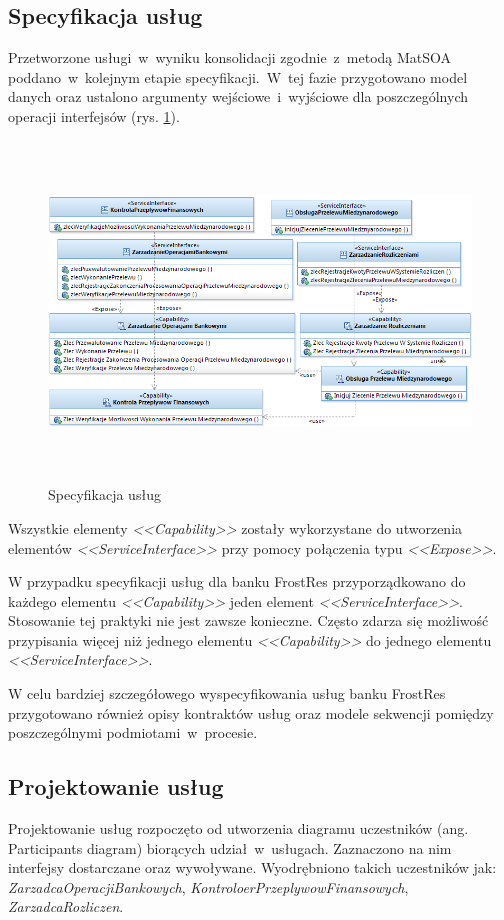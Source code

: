 \subsection{Specyfikacja usług}
Przetworzone usługi~w~wyniku konsolidacji zgodnie~z~metodą MatSOA poddano~w~kolejnym etapie specyfikacji.~W~tej fazie przygotowano model danych oraz ustalono argumenty wejściowe~i~wyjściowe dla poszczególnych operacji interfejsów (rys. \ref{services_specification}).

\begin{figure}[h!tbp]
\begin{centering}
\includegraphics[width=16cm, height=9cm]{img/services_specification_model.png}
\caption[Specyfikacja usług]{Specyfikacja usług}\label{services_specification}
\end{centering}
\end{figure}

Wszystkie elementy \emph{<<Capability>>} zostały wykorzystane do utworzenia elementów \emph{<<ServiceInterface>>} przy pomocy połączenia typu \emph{<<Expose>>}. 

W przypadku specyfikacji usług dla banku FrostRes przyporządkowano do każdego elementu \emph{<<Capability>>} jeden element \emph{<<ServiceInterface>>}. Stosowanie tej praktyki nie jest zawsze konieczne. Często zdarza się możliwość przypisania więcej niż jednego elementu \emph{<<Capability>>} do jednego elementu \emph{<<ServiceInterface>>}. 

W celu bardziej szczegółowego wyspecyfikowania usług banku FrostRes przygotowano również opisy kontraktów usług oraz modele sekwencji pomiędzy poszczególnymi podmiotami~w~procesie. 

\subsection{Projektowanie usług}
Projektowanie usług rozpoczęto od utworzenia diagramu uczestników (ang. Participants diagram) biorących udział~w~usługach. Zaznaczono na nim interfejsy dostarczane oraz wywoływane. Wyodrębniono takich uczestników jak: \emph{ZarzadcaOperacjiBankowych}, \emph{KontroloerPrzeplywowFinansowych}, \emph{ZarzadcaRozliczen}.

